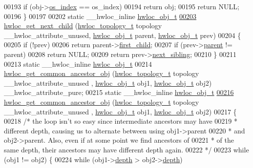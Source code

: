 \begin{DoxyCode}
00193     \textcolor{keywordflow}{if} (obj->\hyperlink{a00016_a61a7a80a68eaccbaaa28269e678c81a9}{os_index} == os\_index)
00194       \textcolor{keywordflow}{return} obj;
00195   \textcolor{keywordflow}{return} NULL;
00196 \}
00197 
00202 \textcolor{keyword}{static} \_\_hwloc\_inline \hyperlink{a00016}{hwloc_obj_t}
\hypertarget{a00031_source_l00203}{}\hyperlink{a00053_gae5ef1af636849f77714e1584ba78cf9c}{00203} \hyperlink{a00053_gae5ef1af636849f77714e1584ba78cf9c}{hwloc_get_next_child} (\hyperlink{a00039_ga9d1e76ee15a7dee158b786c30b6a6e38}{hwloc_topology_t} topology \_\_hwloc\_attribute\_unused, 
      \hyperlink{a00016}{hwloc_obj_t} parent, \hyperlink{a00016}{hwloc_obj_t} prev)
00204 \{
00205   \textcolor{keywordflow}{if} (!prev)
00206     \textcolor{keywordflow}{return} parent->\hyperlink{a00016_af51d08a0a79dba517c06c5afedc8d2dc}{first_child};
00207   \textcolor{keywordflow}{if} (prev->\hyperlink{a00016_adc494f6aed939992be1c55cca5822900}{parent} != parent)
00208     \textcolor{keywordflow}{return} NULL;
00209   \textcolor{keywordflow}{return} prev->\hyperlink{a00016_a7f2343ed476fe4942e6fffd4cade1b40}{next_sibling};
00210 \}
00211 
00213 \textcolor{keyword}{static} \_\_hwloc\_inline \hyperlink{a00016}{hwloc_obj_t}
00214 \hyperlink{a00053_ga52a334f17c6b5b409d5cc6bb4ab8a2ab}{hwloc_get_common_ancestor_obj} (\hyperlink{a00039_ga9d1e76ee15a7dee158b786c30b6a6e38}{hwloc_topology_t} topology \_\_hwloc\_attribute\_unused
      , \hyperlink{a00016}{hwloc_obj_t} obj1, \hyperlink{a00016}{hwloc_obj_t} obj2) \_\_hwloc\_attribute\_pure;
00215 \textcolor{keyword}{static} \_\_hwloc\_inline \hyperlink{a00016}{hwloc_obj_t}
\hypertarget{a00031_source_l00216}{}\hyperlink{a00053_ga52a334f17c6b5b409d5cc6bb4ab8a2ab}{00216} \hyperlink{a00053_ga52a334f17c6b5b409d5cc6bb4ab8a2ab}{hwloc_get_common_ancestor_obj} (\hyperlink{a00039_ga9d1e76ee15a7dee158b786c30b6a6e38}{hwloc_topology_t} topology \_\_hwloc\_attribute\_unused
      , \hyperlink{a00016}{hwloc_obj_t} obj1, \hyperlink{a00016}{hwloc_obj_t} obj2)
00217 \{
00218   \textcolor{comment}{/* the loop isn't so easy since intermediate ancestors may have}
00219 \textcolor{comment}{   * different depth, causing us to alternate between using obj1->parent}
00220 \textcolor{comment}{   * and obj2->parent. Also, even if at some point we find ancestors of}
00221 \textcolor{comment}{   * of the same depth, their ancestors may have different depth again.}
00222 \textcolor{comment}{   */}
00223   \textcolor{keywordflow}{while} (obj1 != obj2) \{
00224     \textcolor{keywordflow}{while} (obj1->\hyperlink{a00016_a9d82690370275d42d652eccdea5d3ee5}{depth} > obj2->\hyperlink{a00016_a9d82690370275d42d652eccdea5d3ee5}{depth})

\end{DoxyCode}
